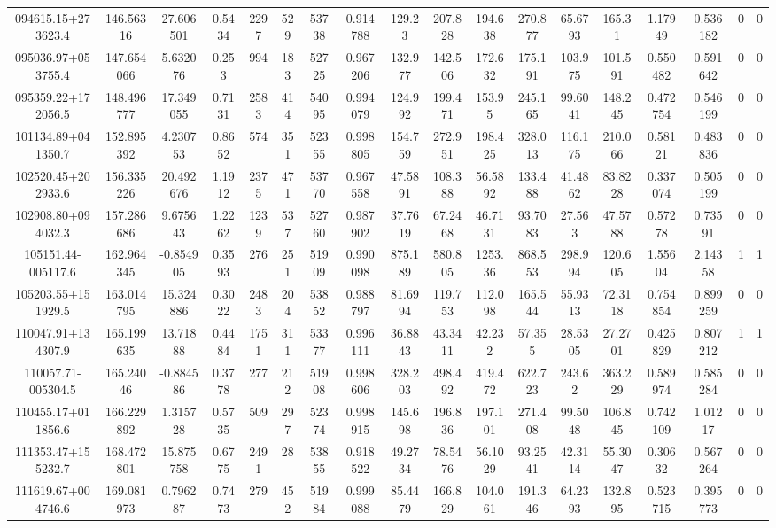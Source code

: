 \begin{table}
\begin{tabular}{cccccccccccccccccc}
094615.15+273623.4 & 146.56316 & 27.606501 & 0.5434 & 2297 & 529 & 53738 & 0.914788 & 129.23 & 207.828 & 194.638 & 270.877 & 65.6793 & 165.31 & 1.17949 & 0.536182 & 0 & 0 \\
095036.97+053755.4 & 147.654066 & 5.632076 & 0.253 & 994 & 183 & 52725 & 0.967206 & 132.977 & 142.506 & 172.632 & 175.191 & 103.975 & 101.591 & 0.550482 & 0.591642 & 0 & 0 \\
095359.22+172056.5 & 148.496777 & 17.349055 & 0.7131 & 2583 & 414 & 54095 & 0.994079 & 124.992 & 199.471 & 153.95 & 245.165 & 99.6041 & 148.245 & 0.472754 & 0.546199 & 0 & 0 \\
101134.89+041350.7 & 152.895392 & 4.230753 & 0.8652 & 574 & 351 & 52355 & 0.998805 & 154.759 & 272.951 & 198.425 & 328.013 & 116.175 & 210.066 & 0.58121 & 0.483836 & 0 & 0 \\
102520.45+202933.6 & 156.335226 & 20.492676 & 1.1912 & 2375 & 471 & 53770 & 0.967558 & 47.5891 & 108.388 & 56.5892 & 133.488 & 41.4862 & 83.8228 & 0.337074 & 0.505199 & 0 & 0 \\
102908.80+094032.3 & 157.286686 & 9.675643 & 1.2262 & 1239 & 537 & 52760 & 0.987902 & 37.7619 & 67.2468 & 46.7131 & 93.7083 & 27.563 & 47.5788 & 0.57278 & 0.73591 & 0 & 0 \\
105151.44-005117.6 & 162.964345 & -0.854905 & 0.3593 & 276 & 251 & 51909 & 0.990098 & 875.189 & 580.805 & 1253.36 & 868.553 & 298.994 & 120.605 & 1.55604 & 2.14358 & 1 & 1 \\
105203.55+151929.5 & 163.014795 & 15.324886 & 0.3022 & 2483 & 204 & 53852 & 0.988797 & 81.6994 & 119.753 & 112.098 & 165.544 & 55.9313 & 72.3118 & 0.754854 & 0.899259 & 0 & 0 \\
110047.91+134307.9 & 165.199635 & 13.71888 & 0.4484 & 1751 & 311 & 53377 & 0.996111 & 36.8843 & 43.3411 & 42.232 & 57.355 & 28.5305 & 27.2701 & 0.425829 & 0.807212 & 1 & 1 \\
110057.71-005304.5 & 165.24046 & -0.884586 & 0.3778 & 277 & 212 & 51908 & 0.998606 & 328.203 & 498.492 & 419.472 & 622.723 & 243.62 & 363.229 & 0.589974 & 0.585284 & 0 & 0 \\
110455.17+011856.6 & 166.229892 & 1.315728 & 0.5735 & 509 & 297 & 52374 & 0.998915 & 145.698 & 196.836 & 197.101 & 271.408 & 99.5048 & 106.845 & 0.742109 & 1.01217 & 0 & 0 \\
111353.47+155232.7 & 168.472801 & 15.875758 & 0.6775 & 2491 & 28 & 53855 & 0.918522 & 49.2734 & 78.5476 & 56.1029 & 93.2541 & 42.3114 & 55.3047 & 0.30632 & 0.567264 & 0 & 0 \\
111619.67+004746.6 & 169.081973 & 0.796287 & 0.7473 & 279 & 452 & 51984 & 0.999088 & 85.4479 & 166.829 & 104.061 & 191.346 & 64.2393 & 132.895 & 0.523715 & 0.395773 & 0 & 0 \\

\end{tabular}
\end{table}

